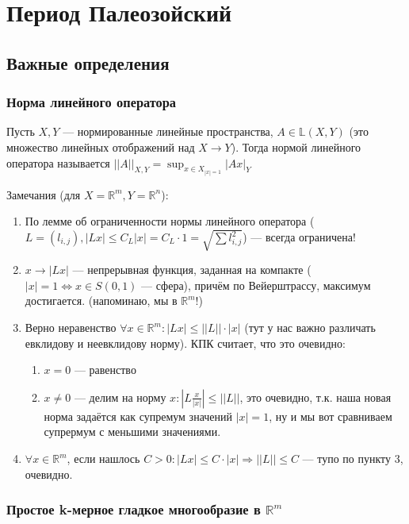 \documentclass{article}
\begin{document}
\tableofcontents


\setlength{\parskip}{6pt}%
\newpage
{}


\section{Период Палеозойский}
\subsection{Важные определения}
\subsubsection{Норма линейного оператора}
Пусть $X, Y$ --- нормированные линейные пространства, $A \in \mathbb{L}(X, Y)$ (это множество линейных отображений над $X \rightarrow Y$). Тогда нормой линейного оператора называется $||A||_{X, Y} = \sup_{{x \in X}_{|x| = 1}}{|Ax|}_Y$

Замечания (для $X = \mathbb{R}^m, Y = \mathbb{R}^n$):
\begin{enumerate}
\item По лемме об ограниченности нормы линейного оператора ($L = (l_{i, j}), |Lx| \le C_L|x| = C_L \cdot 1 = \sqrt{\sum{l_{i, j}^2}}$) --- всегда ограничена!
\item $x \rightarrow |Lx|$ --- непрерывная функция, заданная на компакте ($|x| = 1 \Leftrightarrow x \in S(0, 1)$ --- сфера), причём по Вейерштрассу, максимум достигается. (напоминаю, мы в $\mathbb{R}^m!$)
\item Верно неравенство $\forall x \in \mathbb{R}^m: |Lx| \le ||L|| \cdot |x|$ (тут у нас важно различать евклидову и неевклидову норму). КПК считает, что это очевидно: 
    \begin{enumerate}
        \item $x = 0$ --- равенство
        \item $x \neq 0$ --- делим на норму $x: |L \frac{x}{|x|}| \le ||L||$, это очевидно, т.к. наша новая норма задаётся как супремум значений $|x| = 1$, ну и мы вот сравниваем супрермум с меньшими значениями.
    \end{enumerate}
\item $\forall x \in \mathbb{R}^m$, если нашлось $C > 0: |Lx| \le C \cdot |x| \Rightarrow ||L|| \le C$ --- тупо по пункту 3, очевидно.
\end{enumerate}

\subsubsection{Простое k-мерное гладкое многообразие в $\mathbb{R}^m$}
\end{document}
